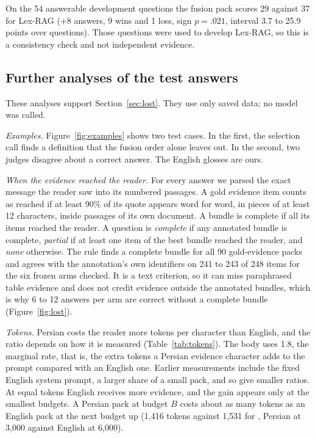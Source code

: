 On the 54 answerable development questions the fusion pack scores 29 against 37 for Lex-RAG (+8 answers, 9 wins and 1 loss, sign $p=.021$, interval 3.7 to 25.9 points over questions). Those questions were used to develop Lex-RAG, so this is a consistency check and not independent evidence.

\subsection{Further analyses of the test answers}
\label{app:analysis}
These analyses support Section~\ref{sec:lost}. They use only saved data; no model was called.

\emph{Examples.} Figure~\ref{fig:examples} shows two test cases. In the first, the selection call finds a definition that the fusion order alone leaves out. In the second, two judges disagree about a correct answer. The English glosses are ours.



\emph{When the evidence reached the reader.} For every answer we parsed the exact message the reader saw into its numbered passages. A gold evidence item counts as reached if at least 90\% of its quote appears word for word, in pieces of at least 12 characters, inside passages of its own document. A bundle is complete if all its items reached the reader. A question is \emph{complete} if any annotated bundle is complete, \emph{partial} if at least one item of the best bundle reached the reader, and \emph{none} otherwise. The rule finds a complete bundle for all 90 gold-evidence packs and agrees with the annotation's own identifiers on 241 to 243 of 248 items for the six frozen arms checked. It is a text criterion, so it can miss paraphrased table evidence and does not credit evidence outside the annotated bundles, which is why 6 to 12 answers per arm are correct without a complete bundle (Figure~\ref{fig:lost}).

\emph{Tokens.} Persian costs the reader more tokens per character than English, and the ratio depends on how it is measured (Table~\ref{tab:tokens}). The body uses 1.8, the marginal rate, that is, the extra tokens a Persian evidence character adds to the prompt compared with an English one. Earlier measurements include the fixed English system prompt, a larger share of a small pack, and so give smaller ratios. At equal tokens English receives more evidence, and the gain appears only at the smallest budgets. A Persian pack at budget $B$ costs about as many tokens as an English pack at the next budget up (1,416 tokens against 1,531 for \hybrid{}, Persian at 3,000 against English at 6,000).

